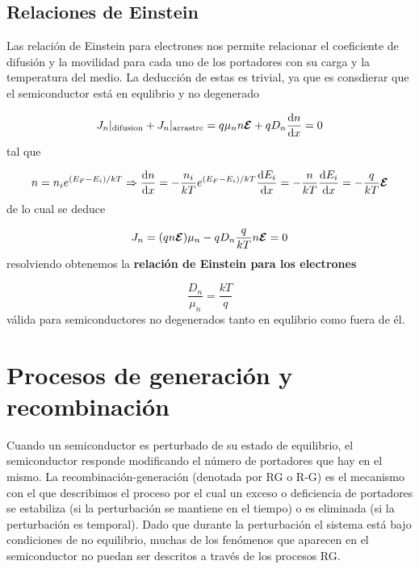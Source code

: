 \subsection{Relaciones de Einstein}

Las relación de Einstein para electrones nos permite relacionar el coeficiente de difusión y la movilidad para cada uno de los portadores con su carga y la temperatura del medio. La deducción de estas es trivial, ya que es consdierar que el semiconductor está en equlibrio y no degenerado

\begin{equation}
	J_n |_{\text{difusion}} +J_n |_{\text{arrastre}} = q\mu_n n \boldsymbol{\mathcal{E}} + qD_n\frac{\mathrm{d} n}{\mathrm{d} x} = 0
\end{equation}
tal que

\begin{equation}
	n=n_i e^{(E_F-E_i)/kT} \Rightarrow \frac{\mathrm{d} n}{\mathrm{d} x} = - \frac{n_i}{kT} e^{(E_F-E_i)/kT} \frac{\mathrm{d} E_i}{\mathrm{d} x} = - \frac{n}{kT} \frac{\mathrm{d} E_i}{\mathrm{d} x} = - \frac{q}{kT} \boldsymbol{\mathcal{E}}
\end{equation}
de lo cual se deduce

\begin{equation}
	J_n = (qn\boldsymbol{\mathcal{E}}) \mu_n - qD_n \frac{q}{kT} n \boldsymbol{\mathcal{E}} = 0
\end{equation}
resolviendo obtenemos la \textbf{relación de Einstein para los electrones}

\begin{equation}
	\frac{D_n}{\mu_n} = \frac{kT}{q}
\end{equation}
válida para semiconductores no degenerados tanto en equlibrio como fuera de él.




\section{Procesos de generación y recombinación}

Cuando un semiconductor es perturbado de su estado de equilibrio, el semiconductor responde modificando el número de portadores que hay en el mismo. La recombinación-generación (denotada por RG o R-G) es el mecanismo con el que describimos el proceso por el cual un exceso o deficiencia de portadores se estabiliza (si la perturbación se mantiene en el tiempo) o es eliminada (si la perturbación es temporal). Dado que durante la perturbación el sistema está bajo condiciones de no equilibrio, muchas de los fenómenos que aparecen en el semiconductor no puedan ser descritos a través de los procesos RG.

